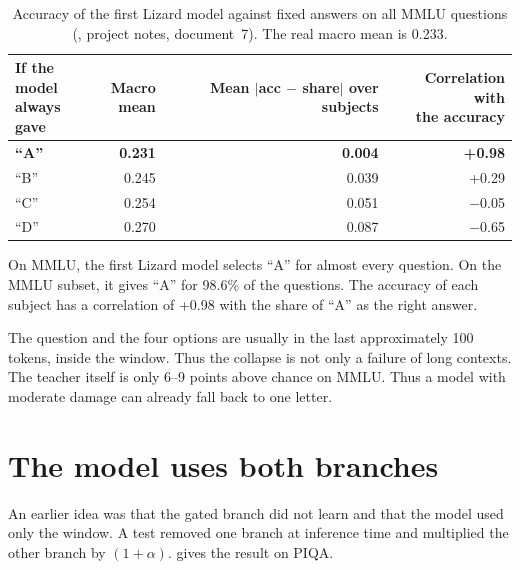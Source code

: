 \begin{table}[ht]
\centering
\small
\caption[Accuracy of the first Lizard model against fixed answers]{Accuracy of the first Lizard model against fixed answers on all MMLU questions (, project notes, document~7). The real macro mean is 0.233.}
\label{tab:letters}
\begin{tabular}{@{}lrrr@{}}
\toprule
\makecell[l]{If the model\\always gave} & \makecell[r]{Macro\\mean} & \makecell[r]{Mean $|$acc $-$ share$|$\\over subjects} & \makecell[r]{Correlation with\\the accuracy} \\
\midrule
\textbf{\enquote{A}} & \textbf{0.231} & \textbf{0.004} & \textbf{+0.98} \\
\enquote{B} & 0.245 & 0.039 & +0.29 \\
\enquote{C} & 0.254 & 0.051 & $-$0.05 \\
\enquote{D} & 0.270 & 0.087 & $-$0.65 \\
\bottomrule
\end{tabular}
\end{table}

\begin{finding}
On MMLU, the first Lizard model selects \enquote{A} for almost every question. On the MMLU subset, it gives \enquote{A} for 98.6\% of the questions. The accuracy of each subject has a correlation of +0.98 with the share of \enquote{A} as the right answer.
\end{finding}

The question and the four options are usually in the last approximately 100 tokens, inside the window. Thus the collapse is not only a failure of long contexts. The teacher itself is only 6--9 points above chance on MMLU. Thus a model with moderate damage can already fall back to one letter.

\section{The model uses both branches}
\label{sec:ablation}

An earlier idea was that the gated branch did not learn and that the model used only the window. A test removed one branch at inference time and multiplied the other branch by $(1 + \alpha)$.  gives the result on PIQA.

